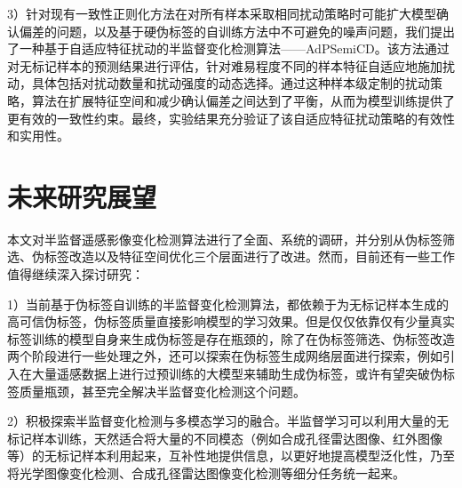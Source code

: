 \documentclass[lang=chs, degree=master, blindreview=false, adobe=false]{yanputhesis}
\begin{document}
    3）针对现有一致性正则化方法在对所有样本采取相同扰动策略时可能扩大模型确认偏差的问题，以及基于硬伪标签的自训练方法中不可避免的噪声问题，我们提出了一种基于自适应特征扰动的半监督变化检测算法——AdPSemiCD。该方法通过对无标记样本的预测结果进行评估，针对难易程度不同的样本特征自适应地施加扰动，具体包括对扰动数量和扰动强度的动态选择。通过这种样本级定制的扰动策略，算法在扩展特征空间和减少确认偏差之间达到了平衡，从而为模型训练提供了更有效的一致性约束。最终，实验结果充分验证了该自适应特征扰动策略的有效性和实用性。
\section{未来研究展望}
本文对半监督遥感影像变化检测算法进行了全面、系统的调研，并分别从伪标签筛选、伪标签改造以及特征空间优化三个层面进行了改进。然而，目前还有一些工作值得继续深入探讨研究：

1）当前基于伪标签自训练的半监督变化检测算法，都依赖于为无标记样本生成的高可信伪标签，伪标签质量直接影响模型的学习效果。但是仅仅依靠仅有少量真实标签训练的模型自身来生成伪标签是存在瓶颈的，除了在伪标签筛选、伪标签改造两个阶段进行一些处理之外，还可以探索在伪标签生成网络层面进行探索，例如引入在大量遥感数据上进行过预训练的大模型来辅助生成伪标签，或许有望突破伪标签质量瓶颈，甚至完全解决半监督变化检测这个问题。

2）积极探索半监督变化检测与多模态学习的融合。半监督学习可以利用大量的无标记样本训练，天然适合将大量的不同模态（例如合成孔径雷达图像、红外图像等）的无标记样本利用起来，互补性地提供信息，以更好地提高模型泛化性，乃至将光学图像变化检测、合成孔径雷达图像变化检测等细分任务统一起来。
\cleardoublepage
\appendix
\end{document}
